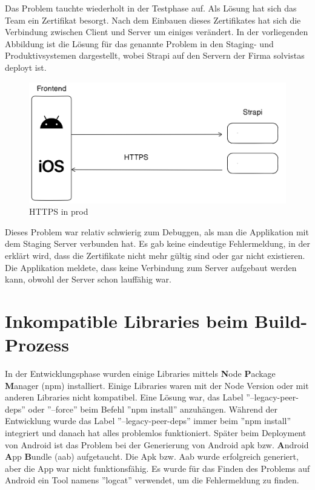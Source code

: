 Das Problem tauchte wiederholt in der Testphase auf. Als Lösung hat sich das Team ein Zertifikat besorgt. Nach dem Einbauen dieses Zertifikates hat sich die Verbindung zwischen Client und Server um einiges verändert.
In der vorliegenden Abbildung ist die Lösung für das genannte Problem in den Staging- und Produktivsystemen dargestellt, wobei Strapi auf den Servern der Firma solvistas deployt ist.
\begin{figure}[H]
    \centering
    \includegraphics*[width=\textwidth]{./pics/https.png}
    \caption{HTTPS in prod}
\end{figure}

Dieses Problem war relativ schwierig zum Debuggen,
als man die Applikation mit dem Staging Server verbunden hat.
Es gab keine eindeutige Fehlermeldung, in der erklärt wird, dass die Zertifikate nicht mehr gültig sind oder gar nicht existieren.
Die Applikation meldete, dass keine Verbindung zum Server aufgebaut werden kann, obwohl der Server schon lauffähig war.





\section{Inkompatible Libraries beim Build-Prozess}\label{sec:inkompatible-libraries-beim-build-prozess}
In der Entwicklungsphase wurden einige Libraries mittels \textbf{N}ode  \textbf{P}ackage \textbf{M}anager (npm) installiert.
Einige Libraries waren mit der Node Version oder mit anderen Libraries nicht kompatibel.
Eine Lösung war, das Label ''--legacy-peer-deps'' oder ''--force'' beim Befehl ''npm install'' anzuhängen.
Während der Entwicklung wurde das Label ''--legacy-peer-deps'' immer beim ''npm install'' integriert
und danach hat alles problemlos funktioniert.
Später beim Deployment von Android ist das Problem
bei der Generierung von Android apk bzw.
\textbf{A}ndroid \textbf{A}pp \textbf{B}undle (aab) aufgetaucht.
Die Apk bzw.
Aab wurde erfolgreich generiert, aber die App war nicht funktionsfähig.
Es wurde für das Finden des Problems auf Android ein Tool namens ''logcat'' verwendet,
um die Fehlermeldung zu finden.


